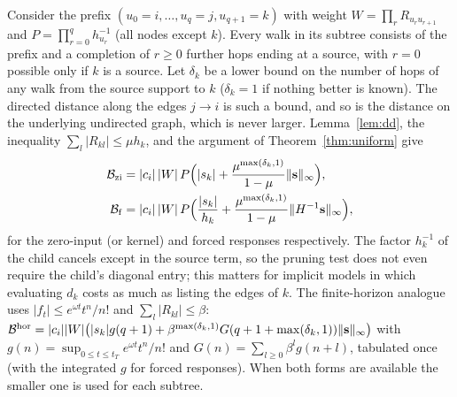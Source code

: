 Consider the prefix $(u_0=i,\dots,u_q=j,u_{q+1}=k)$ with weight $W=\prod_rR_{u_ru_{r+1}}$ and $P=\prod_{r=0}^{q}h_{u_r}^{-1}$ (all nodes except $k$). Every walk in its subtree consists of the prefix and a completion of $r\ge0$ further hops ending at a source, with $r=0$ possible only if $k$ is a source. Let $\delta_k$ be a lower bound on the number of hops of any walk from the source support to $k$ ($\delta_k=1$ if nothing better is known). The directed distance along the edges $j\to i$ is such a bound, and so is the distance on the underlying undirected graph, which is never larger. Lemma~\ref{lem:dd}, the inequality $\sum_l|R_{kl}|\le\mu h_k$, and the argument of Theorem~\ref{thm:uniform} give
\begin{align}
\mathcal{B}_{\rm zi}&=|c_i|\,|W|\,P\Big(|s_k|+\frac{\mu^{\max(\delta_k,1)}}{1-\mu}\|{\bf s}\|_\infty\Big),\label{eq:branch_zi}\\
\mathcal{B}_{\rm f}&=|c_i|\,|W|\,P\Big(\frac{|s_k|}{h_k}+\frac{\mu^{\max(\delta_k,1)}}{1-\mu}\|H^{-1}{\bf s}\|_\infty\Big),\label{eq:branch_f}
\end{align}
for the zero-input (or kernel) and forced responses respectively. The factor $h_k^{-1}$ of the child cancels except in the source term, so the pruning test does not even require the child's diagonal entry; this matters for implicit models in which evaluating $d_k$ costs as much as listing the edges of $k$. The finite-horizon analogue uses $|f_t|\le e^{\omega t}t^n/n!$ and $\sum_l|R_{kl}|\le\beta$:
$\mathcal{B}^{\rm hor}=|c_i||W|\big(|s_k|g(q+1)+\beta^{\max(\delta_k,1)}G(q+1+\max(\delta_k,1))\|{\bf s}\|_\infty\big)$ with $g(n)=\sup_{0\le t\le t_T}e^{\omega t}t^n/n!$ and $G(n)=\sum_{l\ge0}\beta^lg(n+l)$, tabulated once (with the integrated $g$ for forced responses). When both forms are available the smaller one is used for each subtree.


